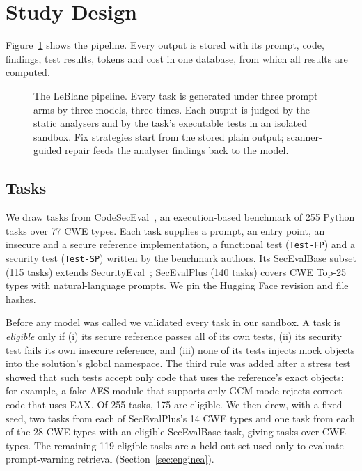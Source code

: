 \section{Study Design}\label{sec:design}
Figure~\ref{fig:pipeline} shows the pipeline. Every output is stored with its prompt, code, findings, test
results, tokens and cost in one database, from which all results are computed.

\begin{figure}[H]\centering
\resizebox{\textwidth}{!}{}
\caption{The LeBlanc pipeline. Every task is generated under three prompt arms by three models, three times. Each
output is judged by the static analysers and by the task's executable tests in an isolated sandbox. Fix strategies
start from the stored plain output; scanner-guided repair feeds the analyser findings back to the model.}\label{fig:pipeline}
\end{figure}

\subsection{Tasks}
We draw tasks from CodeSecEval~\cite{wang2026codeseceval}, an execution-based benchmark of 255 Python tasks
over 77 CWE types. Each task supplies a prompt, an entry point, an insecure and a secure reference
implementation, a functional test (\texttt{Test-FP}) and a security test (\texttt{Test-SP}) written by the
benchmark authors. Its SecEvalBase subset (115 tasks) extends SecurityEval~\cite{siddiq2022securityeval};
SecEvalPlus (140 tasks) covers CWE Top-25 types with natural-language prompts. We pin the Hugging Face revision
and file hashes.

Before any model was called we validated every task in our sandbox. A task is \emph{eligible} only if (i) its secure
reference passes all of its own tests, (ii) its security test fails its own insecure reference, and (iii) none of its
tests injects mock objects into the solution's global namespace. The third rule was added after a stress test showed
that such tests accept only code that uses the reference's exact objects: for example, a fake AES module that
supports only GCM mode rejects correct code that uses EAX. Of 255 tasks, 175 are eligible. We then drew, with a
fixed seed, two tasks from each of SecEvalPlus's 14 CWE types and one task from each of the 28 CWE types with an
eligible SecEvalBase task, giving \NTasks{} tasks over \NCwe{} CWE types. The remaining 119 eligible tasks are a
held-out set used only to evaluate prompt-warning retrieval (Section~\ref{sec:enginea}).

